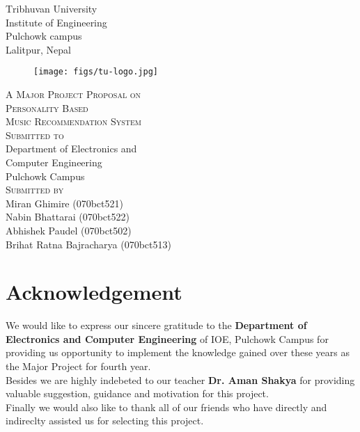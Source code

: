 \documentclass[a4paper,12pt]{article}
\begin{document}
\begin{titlepage}
  \begin{center}
    {\Huge\textsc Tribhuvan University}\\
    [0.03in]
    {\LARGE\textsc Institute of Engineering}\\
    [0.05in]
    {\Large\textsc Pulchowk campus}\\
    [0.02in]
    {\large\textsc Lalitpur, Nepal}\\
    [0.2in]
\begin{figure}[ht!]
  \centering
  \texttt{[image: figs/tu-logo.jpg]}
\end{figure}
    {\LARGE \textsc{A Major Project Proposal on}}\\
    [0.5cm]
    {\Large \textsc{Personality Based \\
    Music Recommendation System}}\\
    [1.8in]
    
    {\LARGE\textsc{Submitted to}}\\
    [0.05in]
    {\large Department of Electronics and }\\
    {\large Computer Engineering}\\
    {\large Pulchowk Campus}\\
    [1in]

    {\LARGE \textsc{\large Submitted by}}\\
    [0.05in]
    {\large Miran Ghimire (070bct521)}\\
    [0.05in]
    {\large Nabin Bhattarai (070bct522)}\\
    [0.05in]
    {\large Abhishek Paudel (070bct502)}\\
    [0.05in]
    {\large Brihat Ratna Bajracharya (070bct513)}\\
    [0.05in]
  \end{center}
\end{titlepage}

\setcounter{page}{2}

\section*{Acknowledgement}
	We would like to express our sincere gratitude to the \textbf{Department of Electronics and Computer Engineering }of IOE, Pulchowk Campus for providing us opportunity to implement the knowledge gained over these years as the Major Project for fourth year.\\ 
	Besides we are highly indebeted to our teacher \textbf{Dr. Aman Shakya} for providing valuable suggestion, guidance and motivation for this project.\\
Finally we would also like to thank all of our friends who have directly and indireclty assisted us for selecting this project.
\cleardoublepage
\end{document}
